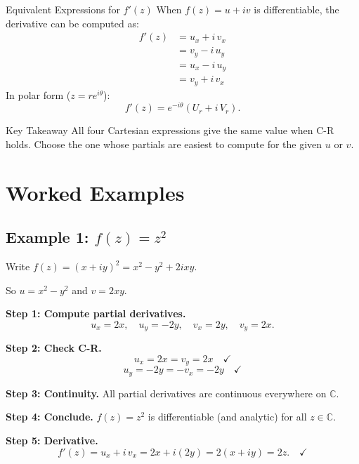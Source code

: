 \documentclass[12pt,a4paper]{article}
\begin{document}
\begin{infobox}{Equivalent Expressions for $f'(z)$}
When $f(z)=u+iv$ is differentiable, the derivative can be computed as:
\begin{align*}
  f'(z) &= u_x + i\,v_x  \tag{use real-axis approach}\\
        &= v_y - i\,u_y  \tag{use imaginary-axis approach}\\
        &= u_x - i\,u_y  \tag{using C-R: $v_x = -u_y$, $v_y = u_x$}\\
        &= v_y + i\,v_x  \tag{using C-R: $u_x = v_y$, $u_y = -v_x$}
\end{align*}
In polar form ($z = re^{i\theta}$):
\[
  f'(z) = e^{-i\theta}\left(U_r + i\,V_r\right).
\]
\end{infobox}

\begin{learnbox}{Key Takeaway}
All four Cartesian expressions give the same value when C-R holds. Choose the one whose partials are easiest to compute for the given $u$ or $v$.
\end{learnbox}

\section{Worked Examples}

\subsection*{Example 1: $f(z) = z^2$}

Write $f(z) = (x+iy)^2 = x^2 - y^2 + 2ixy$.

So $u = x^2 - y^2$ and $v = 2xy$.

\textbf{Step 1: Compute partial derivatives.}
\[
  u_x = 2x, \quad u_y = -2y, \quad v_x = 2y, \quad v_y = 2x.
\]

\textbf{Step 2: Check C-R.}
\[
  u_x = 2x = v_y = 2x \quad \checkmark
\]
\[
  u_y = -2y = -v_x = -2y \quad \checkmark
\]

\textbf{Step 3: Continuity.}
All partial derivatives are continuous everywhere on $\mathbb{C}$.

\textbf{Step 4: Conclude.}
$f(z) = z^2$ is differentiable (and analytic) for all $z \in \mathbb{C}$.

\textbf{Step 5: Derivative.}
\[
  f'(z) = u_x + i\,v_x = 2x + i(2y) = 2(x+iy) = 2z. \quad \checkmark
\]
\end{document}

